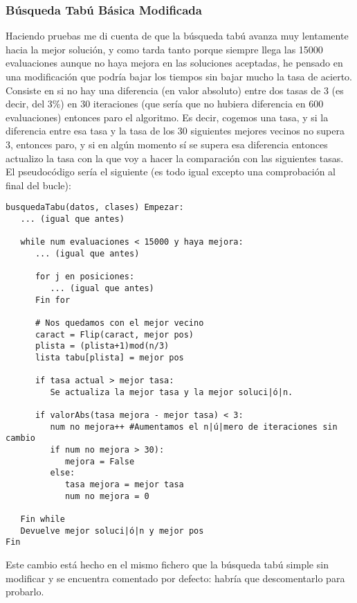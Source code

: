 \documentclass[12pt]{article}
\begin{document}
\subsubsection{Búsqueda Tabú Básica Modificada}
Haciendo pruebas me di cuenta de que la búsqueda tabú avanza muy lentamente hacia la mejor solución, y como tarda tanto porque siempre llega las 15000 evaluaciones aunque no haya mejora en las soluciones aceptadas, he pensado en una modificación que podría bajar los tiempos sin bajar mucho la tasa de acierto. Consiste en si no hay una diferencia (en valor absoluto) entre dos tasas de 3 (es decir, del 3\%) en 30 iteraciones (que sería que no hubiera diferencia en 600 evaluaciones) entonces paro el algoritmo. Es decir, cogemos una tasa, y si la diferencia entre esa tasa y la tasa de los 30 siguientes mejores vecinos no supera 3, entonces paro, y si en algún momento sí se supera esa diferencia entonces actualizo la tasa con la que voy a hacer la comparación con las siguientes tasas.\\
El pseudocódigo sería el siguiente (es todo igual excepto una comprobación al final del bucle):
\begin{lstlisting}
busquedaTabu(datos, clases) Empezar:
   ... (igual que antes)

   while num evaluaciones < 15000 y haya mejora:
      ... (igual que antes)
      
      for j en posiciones:
         ... (igual que antes)
      Fin for
 
      # Nos quedamos con el mejor vecino
      caract = Flip(caract, mejor pos)
      plista = (plista+1)mod(n/3)
      lista tabu[plista] = mejor pos
   
      if tasa actual > mejor tasa:
         Se actualiza la mejor tasa y la mejor soluci|ó|n.
      
      if valorAbs(tasa mejora - mejor tasa) < 3:
         num no mejora++ #Aumentamos el n|ú|mero de iteraciones sin cambio
         if num no mejora > 30):
            mejora = False
         else:
            tasa mejora = mejor tasa
            num no mejora = 0

   Fin while
   Devuelve mejor soluci|ó|n y mejor pos
Fin
\end{lstlisting}

Este cambio está hecho en el mismo fichero que la búsqueda tabú simple sin modificar y se encuentra comentado por defecto: habría que descomentarlo para probarlo.
\end{document}
